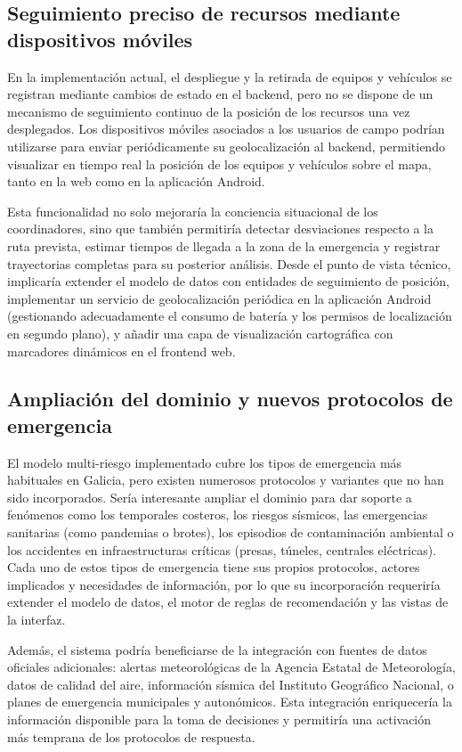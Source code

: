 \subsection{Seguimiento preciso de recursos mediante dispositivos móviles}

En la implementación actual, el despliegue y la retirada de equipos y vehículos se registran mediante cambios de estado en el backend, pero no se dispone de un mecanismo de seguimiento continuo de la posición de los recursos una vez desplegados. Los dispositivos móviles asociados a los usuarios de campo podrían utilizarse para enviar periódicamente su geolocalización al backend, permitiendo visualizar en tiempo real la posición de los equipos y vehículos sobre el mapa, tanto en la web como en la aplicación Android.

Esta funcionalidad no solo mejoraría la conciencia situacional de los coordinadores, sino que también permitiría detectar desviaciones respecto a la ruta prevista, estimar tiempos de llegada a la zona de la emergencia y registrar trayectorias completas para su posterior análisis. Desde el punto de vista técnico, implicaría extender el modelo de datos con entidades de seguimiento de posición, implementar un servicio de geolocalización periódica en la aplicación Android (gestionando adecuadamente el consumo de batería y los permisos de localización en segundo plano), y añadir una capa de visualización cartográfica con marcadores dinámicos en el frontend web.

\subsection{Ampliación del dominio y nuevos protocolos de emergencia}

El modelo multi-riesgo implementado cubre los tipos de emergencia más habituales en Galicia, pero existen numerosos protocolos y variantes que no han sido incorporados. Sería interesante ampliar el dominio para dar soporte a fenómenos como los temporales costeros, los riesgos sísmicos, las emergencias sanitarias (como pandemias o brotes), los episodios de contaminación ambiental o los accidentes en infraestructuras críticas (presas, túneles, centrales eléctricas). Cada uno de estos tipos de emergencia tiene sus propios protocolos, actores implicados y necesidades de información, por lo que su incorporación requeriría extender el modelo de datos, el motor de reglas de recomendación y las vistas de la interfaz.

Además, el sistema podría beneficiarse de la integración con fuentes de datos oficiales adicionales: alertas meteorológicas de la Agencia Estatal de Meteorología, datos de calidad del aire, información sísmica del Instituto Geográfico Nacional, o planes de emergencia municipales y autonómicos. Esta integración enriquecería la información disponible para la toma de decisiones y permitiría una activación más temprana de los protocolos de respuesta.
